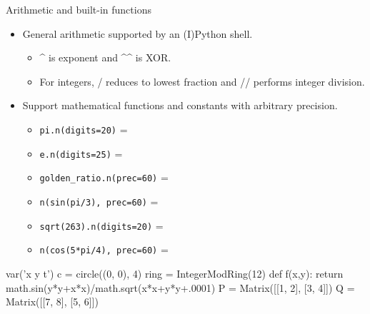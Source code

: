 \documentclass{beamer}
\begin{document}
\begin{frame}[fragile]{Arithmetic and built-in functions}
  \begin{itemize}
   \item General arithmetic supported by an (I)Python shell.
   \begin{itemize}
    \item \textasciicircum \hspace{0pt} is exponent and \textasciicircum\textasciicircum \hspace{0pt} is XOR.
    \item For integers, / reduces to lowest fraction and // performs integer division.
   \end{itemize}
   \item Support mathematical functions and constants with arbitrary precision.
   \begin{itemize}
    \item \verb+pi.n(digits=20)+ = 
    \item \verb+e.n(digits=25)+ = 
    \item \verb+golden_ratio.n(prec=60)+ = 
    \item \verb+n(sin(pi/3), prec=60)+ = 
    \item \verb+sqrt(263).n(digits=20)+ = 
    \item \verb+n(cos(5*pi/4), prec=60)+ = 
   \end{itemize}
  \end{itemize}
\end{frame}

\begin{sagesilent}
 var('x y t')
 c = circle((0, 0), 4)
 ring = IntegerModRing(12)
 def f(x,y):
  return math.sin(y*y+x*x)/math.sqrt(x*x+y*y+.0001)
 P = Matrix([[1, 2], [3, 4]])
 Q = Matrix([[7, 8], [5, 6]])
\end{sagesilent}
\end{document}
